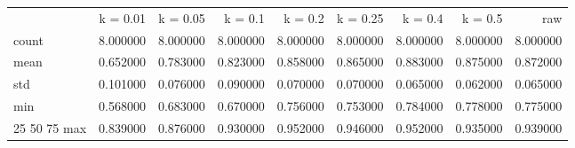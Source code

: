 \begin{tabular}{lrrrrrrrr}
{} & {k = 0.01} & {k = 0.05} & { k = 0.1} & {k = 0.2} & {k = 0.25} & {k = 0.4} & {k = 0.5} & {raw} \\
count & 8.000000 & 8.000000 & 8.000000 & 8.000000 & 8.000000 & 8.000000 & 8.000000 & 8.000000 \\
mean & 0.652000 & 0.783000 & 0.823000 & 0.858000 & 0.865000 & 0.883000 & 0.875000 & 0.872000 \\
std & 0.101000 & 0.076000 & 0.090000 & 0.070000 & 0.070000 & 0.065000 & 0.062000 & 0.065000 \\
min & 0.568000 & 0.683000 & 0.670000 & 0.756000 & 0.753000 & 0.784000 & 0.778000 & 0.775000 \\
25%
50%
75%
max & 0.839000 & 0.876000 & 0.930000 & 0.952000 & 0.946000 & 0.952000 & 0.935000 & 0.939000 \\
\end{tabular}
